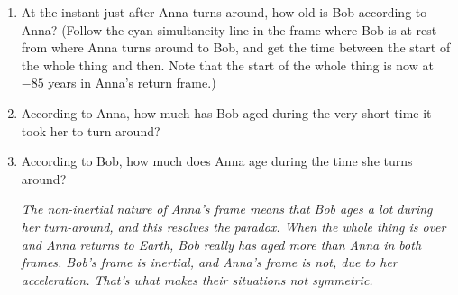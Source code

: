 \begin{enumerate}[wide]
\item At the instant just after Anna turns around, how old is Bob according to Anna?  (Follow the cyan simultaneity line in the frame where Bob is at rest from where Anna turns around to Bob, and get the time between the start of the whole thing and then.  Note that the start of the whole thing is now at $-85$ years in Anna's return frame.)
\answerspace{0.8in}

\item According to Anna, how much has Bob aged during the very short time it took her to turn around?
\answerspace{0.8in}

\item According to Bob, how much does Anna age during the time she turns around?
\answerspace{0.8in}

\textit{The non-inertial nature of Anna's frame means that Bob ages a lot during her turn-around, and this resolves the paradox.  When the whole thing is over and Anna returns to Earth, Bob really has aged more than Anna in both frames.  Bob's frame is inertial, and Anna's frame is not, due to her acceleration.  That's what makes their situations not symmetric.}



\end{enumerate}
